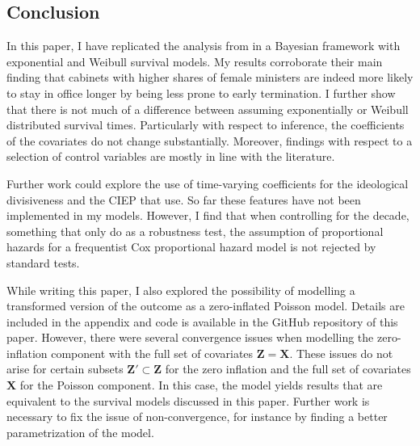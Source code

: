 \documentclass[11pt]{article}
\begin{document}
\clearpage

\subsection{Conclusion}
In this paper, I have replicated the analysis from \textcite{KK20} in a Bayesian framework with exponential and Weibull survival models. My results corroborate their main finding that cabinets with higher shares of female ministers are indeed more likely to stay in office longer by being less prone to early termination. I further show that there is not much of a difference between assuming exponentially or Weibull distributed survival times. Particularly with respect to inference, the coefficients of the covariates do not change substantially. Moreover, findings with respect to a selection of control variables are mostly in line with the literature.

Further work could explore the use of time-varying coefficients for the ideological divisiveness and the CIEP that \textcite{KK20} use. So far these features have not been implemented in my models. However, I find that when controlling for the decade, something that \textcite{KK20} only do as a robustness test, the assumption of proportional hazards for a frequentist Cox proportional hazard model is not rejected by standard tests. 

While writing this paper, I also explored the possibility of modelling a transformed version of the outcome as a zero-inflated Poisson model. Details are included in the appendix and code is available in the GitHub repository of this paper. However, there were several convergence issues when modelling the zero-inflation component with the full set of covariates $\bm{Z} = \bm{X}$. These issues do not arise for certain subsets $\bm{Z}' \subset \bm{Z}$ for the zero inflation and the full set of covariates $\bm{X}$ for the Poisson component. In this case, the model yields results that are equivalent to the survival models discussed in this paper. Further work is necessary to fix the issue of non-convergence, for instance by finding a better parametrization of the model. 

\clearpage

\printbibliography

\newpage


\end{document}
